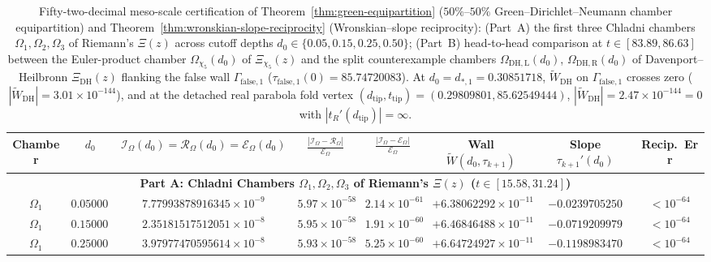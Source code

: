 \documentclass[11pt,reqno]{amsart}
\theoremstyle{definition}
\theoremstyle{remark}
\numberwithin{equation}{section}
\newcommand{\DHf}{\mathrm{DH}}
\begin{document}
\begin{table}[htbp]
\centering
\caption{Fifty-two-decimal meso-scale certification of Theorem~\ref{thm:green-equipartition} ($50\%$--$50\%$ Green--Dirichlet--Neumann chamber equipartition) and Theorem~\ref{thm:wronskian-slope-reciprocity} (Wronskian--slope reciprocity): (Part~A) the first three Chladni chambers $\Omega_1,\Omega_2,\Omega_3$ of Riemann's $\Xi(z)$ across cutoff depths $d_0 \in \{0.05, 0.15, 0.25, 0.50\}$; (Part~B) head-to-head comparison at $t \in [83.89, 86.63]$ between the Euler-product chamber $\Omega_{\chi_5}(d_0)$ of $\Xi_{\chi_5}(z)$ and the split counterexample chambers $\Omega_{\DHf,\mathrm{L}}(d_0)$, $\Omega_{\DHf,\mathrm{R}}(d_0)$ of Davenport--Heilbronn $\Xi_{\DHf}(z)$ flanking the false wall $\Gamma_{\mathrm{false},1}$ ($\tau_{\mathrm{false},1}(0)=85.74720083$). At $d_0 = d_{*,1} = 0.30851718$, $\widetilde{W}_{\DHf}$ on $\Gamma_{\mathrm{false},1}$ crosses zero ($|\widetilde{W}_{\DHf}| = 3.01 \times 10^{-144}$), and at the detached real parabola fold vertex $(d_{\mathrm{tip}},t_{\mathrm{tip}})=(0.29809801, 85.62549444)$, $|\widetilde{W}_{\DHf}| = 2.47 \times 10^{-144} = 0$ with $|t_R'(d_{\mathrm{tip}})|=\infty$.}
\label{tab:meso-certification}
\tiny
\setlength{\tabcolsep}{1.6pt}
\renewcommand{\arraystretch}{1.15}
\begin{tabular}{@{}cccccccc@{}}
\toprule
Chamber & $d_0$ & $\mathcal{I}_{\Omega}(d_0) = \mathcal{R}_{\Omega}(d_0) = \mathcal{E}_{\Omega}(d_0)$ & $\frac{|\mathcal{I}_{\Omega}-\mathcal{R}_{\Omega}|}{\mathcal{E}_{\Omega}}$ & $\frac{|\mathcal{I}_{\Omega}-\mathcal{E}_{\Omega}|}{\mathcal{E}_{\Omega}}$ & Wall $\widetilde{W}(d_0,\tau_{k+1})$ & Slope $\tau_{k+1}'(d_0)$ & Recip.\ Err \\
\midrule
\multicolumn{8}{c}{\textbf{Part A: Chladni Chambers $\Omega_1,\Omega_2,\Omega_3$ of Riemann's $\Xi(z)$ ($t \in [15.58, 31.24]$)}} \\
\midrule
$\Omega_1$ & $0.050000$ & $7.77993878916345 \times 10^{-9}$ & $5.97 \times 10^{-58}$ & $2.14 \times 10^{-61}$ & $+6.38062292 \times 10^{-11}$ & $-0.0239705250$ & $< 10^{-64}$ \\
$\Omega_1$ & $0.150000$ & $2.35181517512051 \times 10^{-8}$ & $5.95 \times 10^{-58}$ & $1.91 \times 10^{-60}$ & $+6.46846488 \times 10^{-11}$ & $-0.0719209979$ & $< 10^{-64}$ \\
$\Omega_1$ & $0.250000$ & $3.97977470595614 \times 10^{-8}$ & $5.93 \times 10^{-58}$ & $5.25 \times 10^{-60}$ & $+6.64724927 \times 10^{-11}$ & $-0.1198983470$ & $< 10^{-64}$ \\

\end{tabular}
\end{table}
\end{document}
